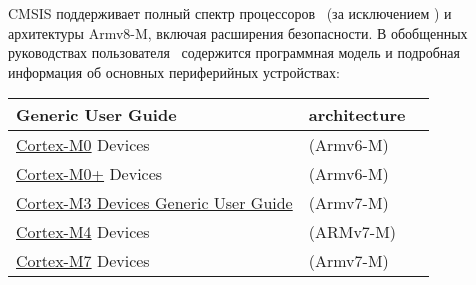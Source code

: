 
CMSIS поддерживает полный спектр процессоров \cm{}\ (за исключением )
и архитектуры Armv8-M, включая расширения безопасности.
В обобщенных руководствах пользователя \cm{}\ содержится программная модель и
подробная информация об основных периферийных устройствах:

\begin{tabular}{l l l}
Generic User Guide & architecture \\
\hline
\href{http://infocenter.arm.com/help/topic/com.arm.doc.dui0497a/DUI0497A_cortex_m0_r0p0_generic_ug.pdf}{Cortex-M0}
Devices &(Armv6-M)\\
\href{http://infocenter.arm.com/help/topic/com.arm.doc.dui0662b/DUI0662B_cortex_m0p_r0p1_dgug.pdf}{Cortex-M0+}
Devices &(Armv6-M)\\
\href{http://infocenter.arm.com/help/topic/com.arm.doc.dui0552a/DUI0552A_cortex_m3_dgug.pdf}{Cortex-M3
Devices Generic User Guide} &(Armv7-M)\\
\href{http://infocenter.arm.com/help/topic/com.arm.doc.dui0553a/DUI0553A_cortex_m4_dgug.pdf}{Cortex-M4}
Devices &(ARMv7-M)\\
\href{http://infocenter.arm.com/help/topic/com.arm.doc.dui0646a/DUI0646A_cortex_m7_dgug.pdf}{Cortex-M7}
Devices &(Armv7-M)\\
\end{tabular}
